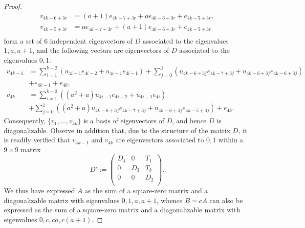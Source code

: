\documentclass{amsart}
\theoremstyle{definition}
\theoremstyle{remark}
\numberwithin{equation}{section}
\begin{document}
\begin{proof}
\begin{align*}
 v_{4k-6+3r}&=(a+1)e_{4k-7+3r}+a e_{4k-6+3r}+e_{4k-5+3r},\\
 v_{4k-5+3r}&=a e_{4k-7+3r}+(a+1) e_{4k-6+3r}+e_{4k-5+3r}\\
\end{align*}
form a set of $6$ independent eigenvectors of $D$ associated to the eigenvalues $1,a,a+1$, and the following vectors are eigenvectors of $D$ associated to the eigenvalues $0,1$:
\begin{align*}
  v_{4k-1}&=\sum_{i=1}^{k-2}    (u_{4i-1} e_{4i-2}+ u_{4i-1} e_{4i-1})+ \sum_{j=0}^{1} (u_{4k-6+3j} e_{4k-7+3j}+u_{4k-6+3j} e_{4k-6+3j})\\&+    e_{4k-1}+   e_{4k}, \quad  \\
  v_{4k}&=\sum_{i=1}^{k-2}   ((a^2+a) u_{4i-1} e_{4i-2}+ u_{4i-1} e_{4i})\\& +\sum_{j=0}^{1}((a^2+a) u_{4k-6+3j} e_{4k-7+3j} +u_{4k-6+3j} e_{4k-5+3j})+ e_{4k}.
\end{align*}
Consequently, $\{v_1,\dots, v_{4k}\}$ is a basis of eigenvectors of $D$, and hence $D$ is diagonalizable. Observe in addition that, due to the structure of the matrix
$D$, it is readily verified that $v_{4k-1}$ and $v_{4k}$ are eigenvectors associated to $0,1$ within a $9\times 9$ matrix
$$D':=\left(
  \begin{array}{ccc}
    D_4 &0& T_1 \\
    0 & D_3& T_k \\
     0 & 0& D_2 \\
  \end{array}
\right).
$$
We thus have expressed $A$ as the sum of a square-zero matrix and a diagonalizable matrix with eigenvalues $0,1,a,a+1$, whence $B=cA$ can also be expressed as the sum of a square-zero matrix and a diagonalizable matrix with eigenvalues $0,c,ca, c(a+1)$.

\medskip


\end{proof}
\end{document}
